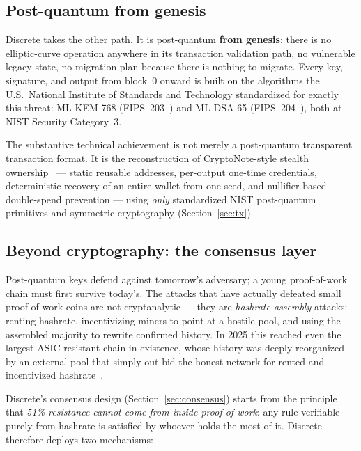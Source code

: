 \documentclass[11pt,a4paper]{article}
\begin{document}
\subsection{Post-quantum from genesis}

Discrete takes the other path. It is post-quantum \textbf{from genesis}:
there is no elliptic-curve operation anywhere in its transaction validation
path, no vulnerable legacy state, no migration plan because there is nothing
to migrate. Every key, signature, and output from block~0 onward is built on
the algorithms the U.S.\ National Institute of Standards and Technology
standardized for exactly this threat: ML-KEM-768 (FIPS~203~\cite{fips203}) and
ML-DSA-65 (FIPS~204~\cite{fips204}), both at NIST Security Category~3.

The substantive technical achievement is not merely a post-quantum transparent
transaction format. It is the reconstruction of CryptoNote-style stealth
ownership~\cite{cryptonote} --- static reusable addresses, per-output one-time
credentials, deterministic recovery of an entire wallet from one seed, and
nullifier-based double-spend prevention --- using \emph{only} standardized
NIST post-quantum primitives and symmetric cryptography
(Section~\ref{sec:tx}).

\subsection{Beyond cryptography: the consensus layer}

Post-quantum keys defend against tomorrow's adversary; a young proof-of-work
chain must first survive today's. The attacks that have actually defeated
small proof-of-work coins are not cryptanalytic --- they are
\emph{hashrate-assembly} attacks: renting hashrate, incentivizing miners to
point at a hostile pool, and using the assembled majority to rewrite
confirmed history. In 2025 this reached even the largest ASIC-resistant chain
in existence, whose history was deeply reorganized by an external pool that
simply out-bid the honest network for rented and incentivized
hashrate~\cite{qubic}.

Discrete's consensus design (Section~\ref{sec:consensus}) starts from the
principle that \emph{51\% resistance cannot come from inside proof-of-work}:
any rule verifiable purely from hashrate is satisfied by whoever holds the
most of it. Discrete therefore deploys two mechanisms:
\end{document}
